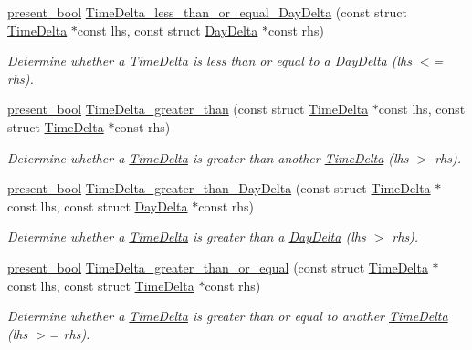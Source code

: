 \begin{DoxyCompactItemize}
\hyperlink{types_8h_a1c24e2cdd988b886e889080ded176ae0}{present\-\_\-bool} \hyperlink{time-delta_8h_a51e3ddbffb4e19ba658011959dfa3d2c}{Time\-Delta\-\_\-less\-\_\-than\-\_\-or\-\_\-equal\-\_\-\-Day\-Delta} (const struct \hyperlink{structTimeDelta}{Time\-Delta} $\ast$const lhs, const struct \hyperlink{structDayDelta}{Day\-Delta} $\ast$const rhs)
\begin{DoxyCompactList}\small\item\em Determine whether a \hyperlink{structTimeDelta}{Time\-Delta} is less than or equal to a \hyperlink{structDayDelta}{Day\-Delta} (lhs $<$= rhs). \end{DoxyCompactList}\item 
\hyperlink{types_8h_a1c24e2cdd988b886e889080ded176ae0}{present\-\_\-bool} \hyperlink{time-delta_8h_aaf70b7980933d5b2eb4261197da08d20}{Time\-Delta\-\_\-greater\-\_\-than} (const struct \hyperlink{structTimeDelta}{Time\-Delta} $\ast$const lhs, const struct \hyperlink{structTimeDelta}{Time\-Delta} $\ast$const rhs)
\begin{DoxyCompactList}\small\item\em Determine whether a \hyperlink{structTimeDelta}{Time\-Delta} is greater than another \hyperlink{structTimeDelta}{Time\-Delta} (lhs $>$ rhs). \end{DoxyCompactList}\item 
\hyperlink{types_8h_a1c24e2cdd988b886e889080ded176ae0}{present\-\_\-bool} \hyperlink{time-delta_8h_a93f36809713589c4661b79c25458c084}{Time\-Delta\-\_\-greater\-\_\-than\-\_\-\-Day\-Delta} (const struct \hyperlink{structTimeDelta}{Time\-Delta} $\ast$const lhs, const struct \hyperlink{structDayDelta}{Day\-Delta} $\ast$const rhs)
\begin{DoxyCompactList}\small\item\em Determine whether a \hyperlink{structTimeDelta}{Time\-Delta} is greater than a \hyperlink{structDayDelta}{Day\-Delta} (lhs $>$ rhs). \end{DoxyCompactList}\item 
\hyperlink{types_8h_a1c24e2cdd988b886e889080ded176ae0}{present\-\_\-bool} \hyperlink{time-delta_8h_afc8207e3bd84d8037f99ad99a0c76b04}{Time\-Delta\-\_\-greater\-\_\-than\-\_\-or\-\_\-equal} (const struct \hyperlink{structTimeDelta}{Time\-Delta} $\ast$const lhs, const struct \hyperlink{structTimeDelta}{Time\-Delta} $\ast$const rhs)
\begin{DoxyCompactList}\small\item\em Determine whether a \hyperlink{structTimeDelta}{Time\-Delta} is greater than or equal to another \hyperlink{structTimeDelta}{Time\-Delta} (lhs $>$= rhs). \end{DoxyCompactList}\item 

\end{DoxyCompactItemize}
